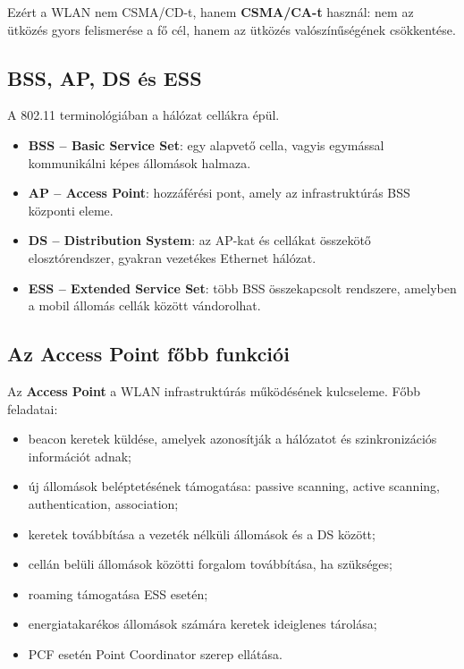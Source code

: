 Ezért a WLAN nem CSMA/CD-t, hanem \textbf{CSMA/CA-t} használ: nem az ütközés gyors felismerése a fő cél, hanem az ütközés valószínűségének csökkentése.

\subsection{BSS, AP, DS és ESS}

A 802.11 terminológiában a hálózat cellákra épül.

\begin{itemize}
  \item \textbf{BSS -- Basic Service Set}: egy alapvető cella, vagyis egymással kommunikálni képes állomások halmaza.
  \item \textbf{AP -- Access Point}: hozzáférési pont, amely az infrastruktúrás BSS központi eleme.
  \item \textbf{DS -- Distribution System}: az AP-kat és cellákat összekötő elosztórendszer, gyakran vezetékes Ethernet hálózat.
  \item \textbf{ESS -- Extended Service Set}: több BSS összekapcsolt rendszere, amelyben a mobil állomás cellák között vándorolhat.
\end{itemize}



\subsection{Az Access Point főbb funkciói}

Az \textbf{Access Point} a WLAN infrastruktúrás működésének kulcseleme. Főbb feladatai:

\begin{itemize}
  \item beacon keretek küldése, amelyek azonosítják a hálózatot és szinkronizációs információt adnak;
  \item új állomások beléptetésének támogatása: passive scanning, active scanning, authentication, association;
  \item keretek továbbítása a vezeték nélküli állomások és a DS között;
  \item cellán belüli állomások közötti forgalom továbbítása, ha szükséges;
  \item roaming támogatása ESS esetén;
  \item energiatakarékos állomások számára keretek ideiglenes tárolása;
  \item PCF esetén Point Coordinator szerep ellátása.
\end{itemize}

